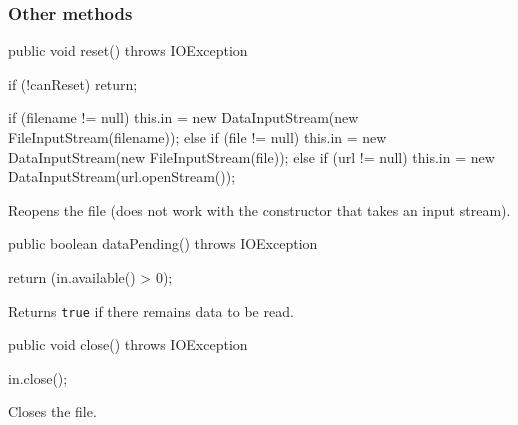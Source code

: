 \subsubsection*{Other methods}

\begin{code}
   public void reset() throws IOException \begin{hide} {
      if (!canReset)
         return;
         
      if (filename != null)
         this.in = new DataInputStream(new FileInputStream(filename));
      else if (file != null)
         this.in = new DataInputStream(new FileInputStream(file));
      else if (url != null)
         this.in = new DataInputStream(url.openStream());
   }
   \end{hide}
\end{code}
\begin{tabb}
Reopens the file (does not work with the constructor that takes an input stream).
\end{tabb}
\begin{code}

   public boolean dataPending() throws IOException \begin{hide} {
      return (in.available() > 0);
   }
   \end{hide}
\end{code}
\begin{tabb}
Returns \texttt{true} if there remains data to be read.
\end{tabb}
\begin{code}

   public void close() throws IOException \begin{hide} {
      in.close();
   }
   \end{hide}
\end{code}
\begin{tabb}
Closes the file.
\end{tabb}

\begin{code}\begin{hide}
}
\end{hide}\end{code}
